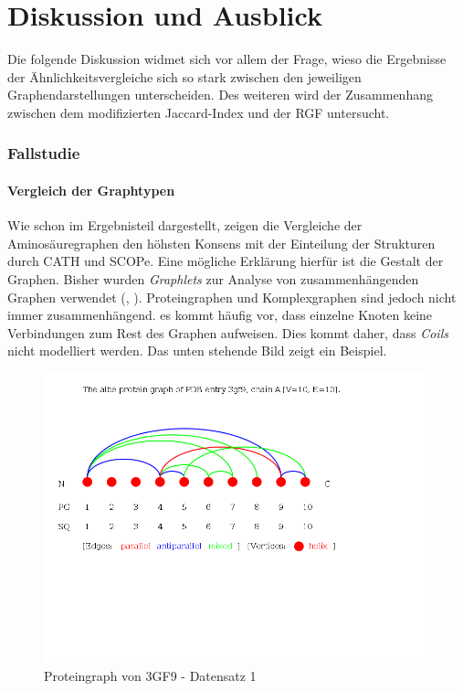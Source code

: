 \documentclass{report}
\begin{document}
\chapter{Diskussion und Ausblick}




Die folgende Diskussion widmet sich vor allem der Frage, wieso die Ergebnisse der \"Ahnlichkeitsvergleiche sich so stark zwischen den jeweiligen Graphendarstellungen unterscheiden.
Des weiteren wird der Zusammenhang zwischen dem modifizierten Jaccard-Index und der RGF untersucht.

\subsection{Fallstudie}
\subsubsection{Vergleich der Graphtypen}

Wie schon im Ergebnisteil dargestellt, zeigen die Vergleiche der Aminos\"auregraphen den h\"ohsten Konsens mit der Einteilung der Strukturen durch CATH und SCOPe. Eine m\"ogliche Erkl\"arung hierf\"ur ist die Gestalt der Graphen. Bisher wurden \textit{Graphlets} zur Analyse von zusammenh\"angenden Graphen verwendet (\cite{sherv_graphlets}, \cite{graphletfrequency}).
Proteingraphen und Komplexgraphen sind jedoch nicht immer zusammenh\"angend. es kommt h\"aufig vor, dass einzelne Knoten keine Verbindungen zum Rest des Graphen aufweisen. Dies kommt daher, dass \textit{Coils} nicht modelliert werden. Das unten stehende Bild zeigt ein Beispiel.

\begin{figure}[h!]
\includegraphics[scale=0.5]{3gf9_A_albe_PG.png}
\caption{Proteingraph von 3GF9 - Datensatz 1}
\end{figure}
\end{document}
